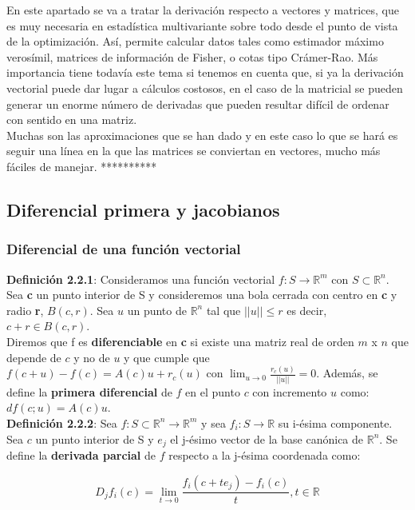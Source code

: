 \documentclass{article}
\theoremstyle{theorem-style}  %
\theoremstyle{definition}
\theoremstyle{example-style}
\begin{document}
En este apartado se va a tratar la derivación respecto a vectores y matrices, que es muy necesaria en estadística multivariante sobre todo desde el punto de vista de la optimización. Así, permite calcular datos tales como estimador máximo verosímil, matrices de información de Fisher, o cotas tipo Crámer-Rao. Más importancia tiene todavía este tema si tenemos en cuenta que, si ya la derivación vectorial puede dar lugar a cálculos costosos, en el caso de la matricial se pueden generar un enorme número de derivadas que pueden resultar difícil de ordenar con sentido en una matriz. \\

Muchas son las aproximaciones que se han dado y en este caso lo que se hará es seguir una línea en la que las matrices se conviertan en vectores, mucho más fáciles de manejar. **********

\subsection{Diferencial primera y jacobianos}

\subsubsection{Diferencial de una función vectorial}
\textbf{Definición 2.2.1}: Consideramos una función vectorial $f: S \rightarrow \mathbb{R}^m$ con $S\subset \mathbb{R}^n$. Sea \textbf{c} un punto interior de S y consideremos una bola cerrada con centro en \textbf{c} y radio \textbf{r}, $B(c,r)$. Sea $u$ un punto de $\mathbb{R}^n$ tal que $||u||\leq r$ es decir, $c+r \in B(c,r)$. \\
Diremos que f es \textbf{diferenciable} en \textbf{c} si existe una matriz real de orden $m$ x $n$ que depende de $c$ y no de $u$ y que cumple que $f(c+u)-f(c) = A(c)u + r_c(u)$ con $\lim_{u\to0} \frac{r_c(u)}{||u||} = 0$. Además, se define la \textbf{primera diferencial} de $f$ en el punto $c$ con incremento $u$ como: $df(c;u)=A(c)u$.\\

\textbf{Definición 2.2.2}: Sea $f: S\subset \mathbb{R}^n \rightarrow \mathbb{R}^m$ y sea $f_i: S \rightarrow \mathbb{R}$ su i-ésima componente. Sea $c$ un punto interior de S y $e_j$ el j-ésimo vector de la base canónica de $\mathbb{R}^n$. Se define la \textbf{derivada parcial} de $f$ respecto a la j-ésima coordenada como: 

$$ D_jf_i(c) = \lim_{t\to0} \frac{f_i(c + te_j ) - f_i(c)}{t}, t\in \mathbb{R} $$  
 
\end{document}
